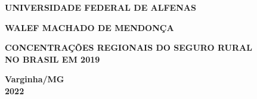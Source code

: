 \documentclass[
	12pt,				%
	openright,			%
	oneside,			%
	a4paper,			%
	chapter=TITLE,		%
	section=TITLE,		%
	english,			%
	french,				%
	spanish,			%
	brazil				%
	]{abntex2}
\begin{document}

\frenchspacing 



\newpage
\vspace{0.5cm}
\begin{center}
    \textbf{UNIVERSIDADE FEDERAL DE ALFENAS}
\end{center}
\vspace{2.5cm}
\begin{center}
    \textbf{WALEF MACHADO DE MENDONÇA}
\end{center}
\vspace{5cm}
\begin{center}
    {\textbf{CONCENTRAÇÕES REGIONAIS DO SEGURO RURAL \\ 
    NO BRASIL EM 2019}}
\end{center}
\vspace{9cm}
\begin{center}
\large\textbf{Varginha/MG \\          2022}
\end{center}




\newpage
\end{document}

